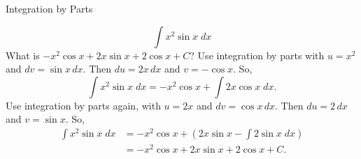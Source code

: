 \documentclass{article}
\begin{document}
\begin{category}{Integration by Parts}
  \begin{clue}[write]
    \[ \int x^{2} \sin x \; dx \]
  \response
    What is $-x^{2} \cos x + 2x \sin x + 2 \cos x + C$?
  \solution
    Use integration by parts with $u=x^{2}$ and $dv=\sin x\,dx.$ Then $du=2x\,dx$ and $v=-\cos x.$ So,
    \[
    \int x^{2} \sin x \; dx = -x^{2} \cos x + \int 2x \cos x \; dx.
    \]
    Use integration by parts again, with $u=2x$ and $dv=\cos x\,dx.$ Then $du=2\,dx$ and $v=\sin x.$ So,
    \begin{align*}
    \int x^{2} \sin x \; dx
    &= -x^{2} \cos x + \left( 2x \sin x - \int 2 \sin x \; dx \right) \\
    &= -x^{2} \cos x + 2x \sin x + 2 \cos x + C.
    \end{align*}
  \end{clue}

\end{category}
\end{document}
